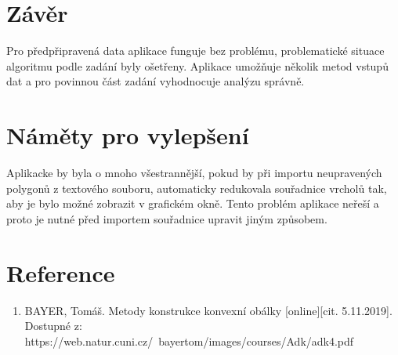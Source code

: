 \documentclass[a4paper, 12pt]{article}
\begin{document}
\section{Závěr}
Pro předpřipravená data aplikace funguje bez problému, problematické situace algoritmu podle
zadání byly ošetřeny. Aplikace umožňuje několik metod vstupů dat a pro povinnou část zadání vyhodnocuje analýzu správně.

\section{Náměty pro vylepšení} 
Aplikacke by byla o mnoho všestrannější, pokud by při importu neupravených polygonů z textového souboru, automaticky redukovala souřadnice vrcholů tak, aby je bylo možné zobrazit v grafickém okně. Tento problém aplikace neřeší a proto je nutné před importem souřadnice upravit jiným způsobem.

\section{Reference}

\begin{enumerate}

\item  BAYER, Tomáš. Metody konstrukce konvexní obálky [online][cit. 5.11.2019]. \\
Dostupné z: https://web.natur.cuni.cz/~bayertom/images/courses/Adk/adk4.pdf  \\

\end{enumerate}
\end{document}
